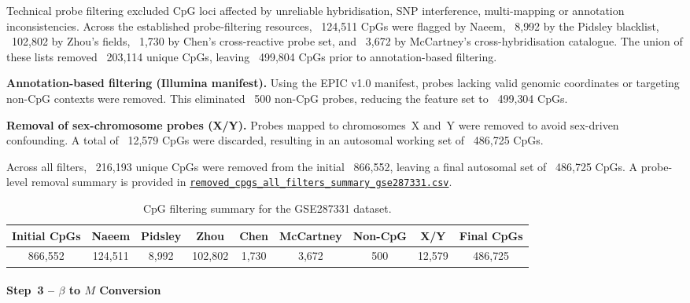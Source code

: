 \documentclass[10pt]{extarticle}
\newcommand{\good}[1]{\textcolor{teal!70!black}{\ding{51}~#1}}
\begin{document}
Technical probe filtering excluded CpG loci affected by unreliable hybridisation, SNP interference, multi-mapping or annotation inconsistencies.
Across the established probe-filtering resources, \good{124{,}511} CpGs were flagged by Naeem, \good{8{,}992} by the Pidsley blacklist, \good{102{,}802} by Zhou’s fields, \good{1{,}730} by Chen’s cross-reactive probe set, and \good{3{,}672} by McCartney’s cross-hybridisation catalogue.
The union of these lists removed \good{203{,}114 unique CpGs}, leaving \good{499{,}804 CpGs} prior to annotation-based filtering.


\textbf{Annotation-based filtering (Illumina manifest).}
Using the EPIC v1.0 manifest, probes lacking valid genomic coordinates or targeting
non-CpG contexts were removed.  
This eliminated \good{500 non-CpG probes}, reducing the feature set to
\good{499{,}304 CpGs}.

\textbf{Removal of sex-chromosome probes (X/Y).}
Probes mapped to chromosomes~X and~Y were removed to avoid sex-driven confounding.
A total of \good{12{,}579 CpGs} were discarded, resulting in an autosomal
working set of \good{486{,}725 CpGs}.

Across all filters, \good{216{,}193 unique CpGs} were removed from the initial
\good{866{,}552}, leaving a final autosomal set of \good{486{,}725 CpGs}.
A probe-level removal summary is provided in 
\href{https://github.com/elisabettaroviera/THESIS/blob/main/05%20-%20CpG%20list/Removed%20CpGs%20per%20Dataset/removed_cpgs_all_filters_summary_gse287331.csv}%
{\texttt{removed\_cpgs\_all\_filters\_summary\_gse287331.csv}}.

\begin{table}[t]
\centering
\caption{CpG filtering summary for the GSE287331 dataset.}
\label{tab:gse287331_cpg_filtering}
\begin{tabular}{c c c c c c c c c}
\hline
Initial CpGs &
Naeem &
Pidsley &
Zhou &
Chen &
McCartney &
Non-CpG &
X/Y &
Final CpGs \\
\hline
866{,}552 &
124{,}511 &
8{,}992 &
102{,}802 &
1{,}730 &
3{,}672 &
500 &
12{,}579 &
486{,}725 \\
\hline
\end{tabular}
\end{table}


\paragraph{Step~3 -- $\beta$ to $M$ Conversion}
\label{par:gse287331_step4}
\end{document}
